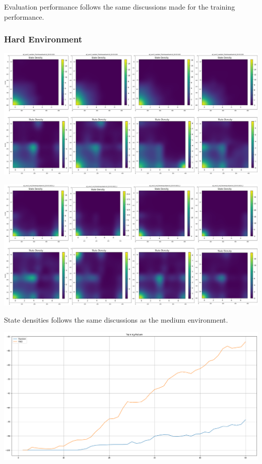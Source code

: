 \documentclass[11pt]{article}
\begin{document}
    Evaluation performance follows the same discussions made for the training performance.

    \subsubsection{Hard Environment}

    \hspace*{-0.3in}
    \includegraphics[scale=0.20]{p1/q1-hard-state-density-random}

    \hspace*{-0.6in}
    \includegraphics[scale=0.20]{p1/q1-hard-state-density-rnd}

    State densities follows the same discussions as the medium environment.

    \hspace*{-0.6in}
    \includegraphics[scale=0.30]{p1/q1-hard-train-compare}
\end{document}
